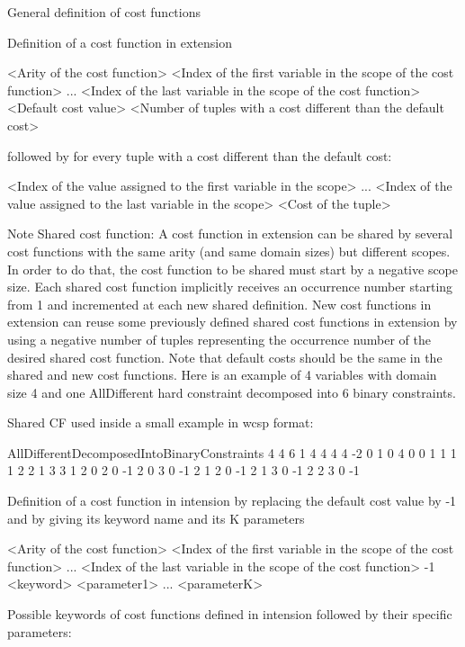 \documentclass{article}
\begin{document}
\begin{DoxyItemize}
\item General definition of cost functions
\begin{DoxyItemize}
\item Definition of a cost function in extension \begin{DoxyVerb}<Arity of the cost function>
<Index of the first variable in the scope of the cost function>
...
<Index of the last variable in the scope of the cost function>
<Default cost value>
<Number of tuples with a cost different than the default cost>
\end{DoxyVerb}
 followed by for every tuple with a cost different than the default cost\-: \begin{DoxyVerb}<Index of the value assigned to the first variable in the scope>
...
<Index of the value assigned to the last variable in the scope>
<Cost of the tuple>
\end{DoxyVerb}
 \begin{DoxyNote}{Note}
Shared cost function\-: A cost function in extension can be shared by several cost functions with the same arity (and same domain sizes) but different scopes. In order to do that, the cost function to be shared must start by a negative scope size. Each shared cost function implicitly receives an occurrence number starting from 1 and incremented at each new shared definition. New cost functions in extension can reuse some previously defined shared cost functions in extension by using a negative number of tuples representing the occurrence number of the desired shared cost function. Note that default costs should be the same in the shared and new cost functions. Here is an example of 4 variables with domain size 4 and one All\-Different hard constraint decomposed into 6 binary constraints.
\end{DoxyNote}

\item Shared C\-F used inside a small example in wcsp format\-: 
\begin{DoxyCode}
AllDifferentDecomposedIntoBinaryConstraints 4 4 6 1
4 4 4 4
-2 0 1 0 4
0 0 1
1 1 1
2 2 1
3 3 1
2 0 2 0 -1
2 0 3 0 -1
2 1 2 0 -1
2 1 3 0 -1
2 2 3 0 -1
\end{DoxyCode}

\item Definition of a cost function in intension by replacing the default cost value by -\/1 and by giving its keyword name and its K parameters \begin{DoxyVerb}<Arity of the cost function>
<Index of the first variable in the scope of the cost function>
...
<Index of the last variable in the scope of the cost function>
-1
<keyword>
<parameter1>
...
<parameterK>
\end{DoxyVerb}

\end{DoxyItemize}
\end{DoxyItemize}Possible keywords of cost functions defined in intension followed by their specific parameters\-:
\end{document}
